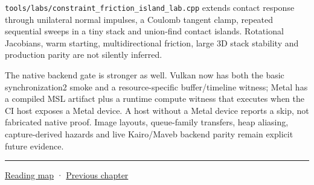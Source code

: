 \texttt{tools/labs/constraint\_friction\_island\_lab.cpp} extends contact response through unilateral normal impulses, a Coulomb tangent clamp, repeated sequential sweeps in a tiny stack and union-find contact islands. Rotational Jacobians, warm starting, multidirectional friction, large 3D stack stability and production parity are not silently inferred.

The native backend gate is stronger as well. Vulkan now has both the basic synchronization2 smoke and a resource-specific buffer/timeline witness; Metal has a compiled MSL artifact plus a runtime compute witness that executes when the CI host exposes a Metal device. A host without a Metal device reports a skip, not fabricated native proof. Image layouts, queue-family transfers, heap aliasing, capture-derived hazards and live Kairo/Maveb backend parity remain explicit future evidence.

\begin{center}\rule{0.5\linewidth}{0.5pt}\end{center}

\hyperref[volume-reading-map]{Reading map} · \hyperref[06-engine-ii-ch046-game-design-from-mechanics-to-narrative-interfaces]{Previous chapter}
